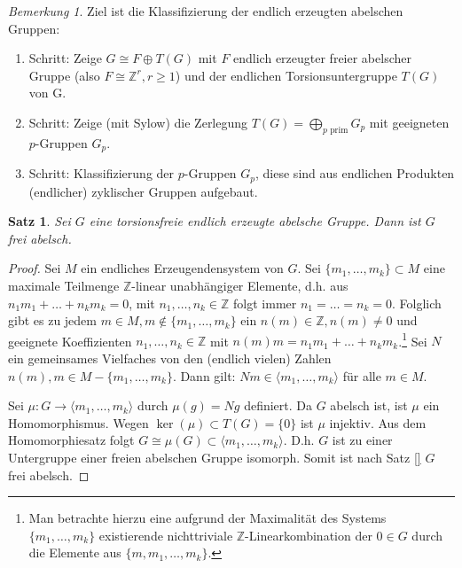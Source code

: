 \documentclass[12pt]{scrartcl} %
\newtheorem{thm}{Satz}[section]
\theoremstyle{definition}
\theoremstyle{remark}
\newtheorem*{nb}{Bemerkung}
\begin{document}
\begin{nb}
Ziel ist die Klassifizierung der endlich erzeugten abelschen Gruppen:
\begin{enumerate}
\item Schritt: Zeige $G \cong F \oplus T(G)$ mit $F$ endlich erzeugter freier abelscher Gruppe (also $F \cong \mathbb{Z}^{r}, r \geq 1$) und der endlichen Torsionsuntergruppe $T(G)$ von G.
\item Schritt: Zeige (mit Sylow) die Zerlegung $T(G) = \bigoplus_{p\text{ prim}} G_{p}$ mit geeigneten $p$-Gruppen $G_{p}$.
\item Schritt: Klassifizierung der $p$-Gruppen $G_{p}$, diese sind aus endlichen Produkten (endlicher) zyklischer Gruppen aufgebaut.
\end{enumerate}
\end{nb}

\begin{thm}
Sei $G$ eine torsionsfreie endlich erzeugte abelsche Gruppe. Dann ist $G$ frei abelsch.
\end{thm}

\begin{proof}
Sei $M$ ein endliches Erzeugendensystem von $G$. 
Sei $\{m_{1}, \dots ,m_{k}\} \subset M$ eine maximale Teilmenge $\mathbb{Z}$-linear unabhängiger Elemente, d.h. aus $n_{1}m_{1}+ \dots +n_{k}m_{k}=0$, mit $n_{1}, \dots ,n_{k} \in \mathbb{Z}$ folgt immer $n_{1}= \dots =n_{k}=0$. 
Folglich gibt es zu jedem $m \in M, m \notin \{m_{1}, \dots ,m_{k}\}$ ein $n(m) \in \mathbb{Z}, n(m)\neq 0$ und geeignete Koeffizienten $n_{1}, \dots ,n_{k} \in \mathbb{Z}$ mit $n(m)m=n_{1}m_{1}+ \dots +n_{k}m_{k}$.\footnote{Man betrachte hierzu eine aufgrund der Maximalität des Systems $\{m_1,\dots,m_k\}$ existierende nichttriviale $\mathbb{Z}$-Linearkombination der $0 \in G$ durch die Elemente aus $\{m,m_1,\dots,m_k\}$.}
Sei $N$ ein gemeinsames Vielfaches von den (endlich vielen) Zahlen $n(m),m \in M-\{m_{1}, \dots ,m_{k}\}$. 
Dann gilt: $Nm \in \langle m_{1}, \dots ,m_{k} \rangle$ für alle $m \in M$.

Sei $\mu :G\rightarrow \langle m_{1}, \dots ,m_{k} \rangle $ durch $\mu (g)=Ng$ definiert. Da $G$ abelsch ist, ist $\mu$ ein Homomorphismus. Wegen $\ker(\mu ) \subset T(G) = \{ 0\}$ ist $\mu$ injektiv. Aus dem Homomorphiesatz folgt $G \cong \mu (G) \subset \langle m_{1}, \dots ,m_{k}\rangle$. D.h. $G$ ist zu einer Untergruppe einer freien abelschen Gruppe isomorph. Somit ist nach Satz \ref{} $G$ frei abelsch. %
\end{proof}
\end{document}
